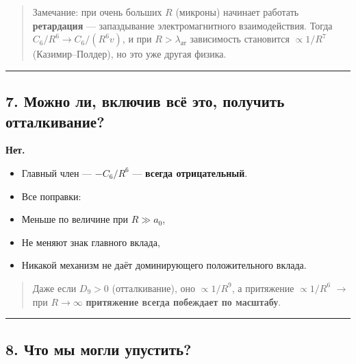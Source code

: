\documentclass[11pt]{article}
\providecommand{\tightlist}{%
      \setlength{\itemsep}{0pt}\setlength{\parskip}{0pt}}
\begin{document}
\begin{quote}
Замечание: при очень больших \(R\) (микроны) начинает работать
\textbf{ретардация} --- запаздывание электромагнитного взаимодействия.
Тогда \(C_6 / R^6 \to C_6 / (R^6 v)\), и при \(R > \lambda_{\text{ат}}\)
зависимость становится \(\propto 1/R^7\) (Казимир--Полдер), но это уже
другая физика.
\end{quote}

\begin{center}\rule{0.5\linewidth}{\linethickness}\end{center}

\subsection{7. Можно ли, включив всё это, получить
отталкивание?}\label{ux43cux43eux436ux43dux43e-ux43bux438-ux432ux43aux43bux44eux447ux438ux432-ux432ux441ux451-ux44dux442ux43e-ux43fux43eux43bux443ux447ux438ux442ux44c-ux43eux442ux442ux430ux43bux43aux438ux432ux430ux43dux438ux435}

\textbf{Нет.}

\begin{itemize}
\tightlist
\item
  Главный член --- \(-C_6 / R^6\) --- \textbf{всегда отрицательный}.
\item
  Все поправки:
\item
  Меньше по величине при \(R \gg a_0\),
\item
  Не меняют знак главного вклада,
\item
  Никакой механизм не даёт доминирующего положительного вклада.
\end{itemize}

\begin{quote}
Даже если \(D_9 > 0\) (отталкивание), оно \(\propto 1/R^9\), а
притяжение \(\propto 1/R^6\) $\rightarrow$ при \(R \to \infty\)
\textbf{притяжение всегда побеждает по масштабу}.
\end{quote}

\begin{center}\rule{0.5\linewidth}{\linethickness}\end{center}

\subsection{8. Что мы могли
упустить?}\label{ux447ux442ux43e-ux43cux44b-ux43cux43eux433ux43bux438-ux443ux43fux443ux441ux442ux438ux442ux44c}
\end{document}
